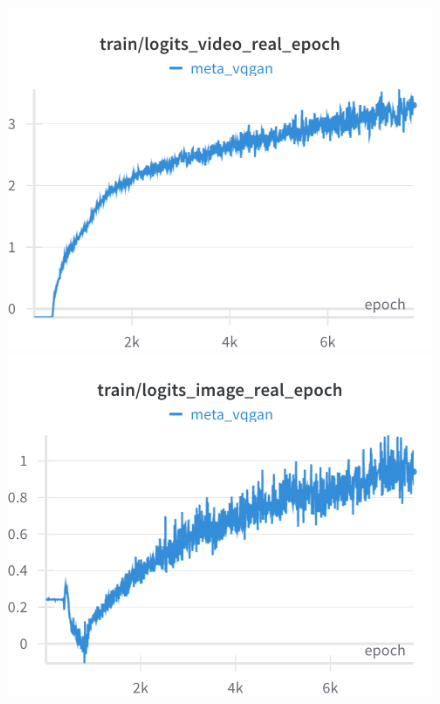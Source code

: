 \begin{figure}[H]
\includegraphics[width=\linewidth]{detailed_engineering/Meta VQGAN/charts/Section-2-Panel-2-7wox2by5g}
\caption{}
\endminipage\hfill
{}
\includegraphics[width=\linewidth]{detailed_engineering/Meta VQGAN/charts/Section-2-Panel-3-2g1f2qecm}
\caption{}
\endminipage
\end{figure}

